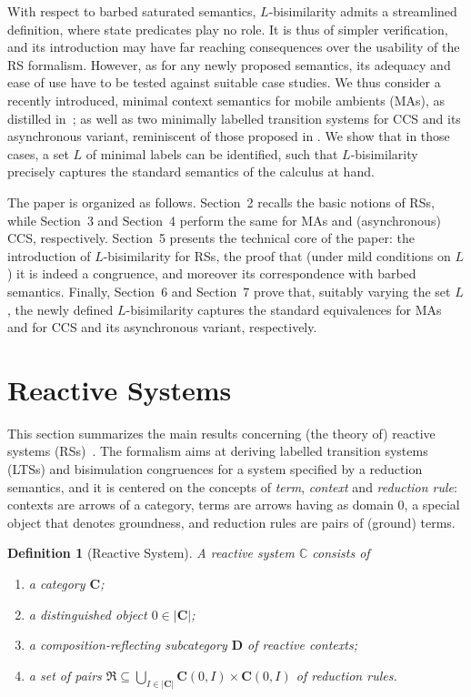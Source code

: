 \documentclass[copyright,creativecommons]{eptcs}
\newcommand{\Rules}[1]{\mathfrak{#1}}
\newcommand{\<}{\langle}
\renewcommand{\>}{\rangle}
\newtheorem{definition}{Definition}{}
\begin{document}
With respect to barbed saturated semantics, $L$-bisimilarity admits a
streamlined definition, where state predicates play no role. It is
thus of simpler verification, and its introduction may have far
reaching consequences over the usability of the RS formalism. However,
as for any newly proposed semantics, its adequacy and ease of use have
to be tested against suitable case studies. We thus consider a recently
introduced, minimal context semantics for mobile ambients (MAs), as distilled
in~\cite{BoGaMo}; as well as two minimally labelled transition systems
for CCS and its asynchronous variant, reminiscent of those proposed in
\cite{bgk:bisimulation-graph-enc}. We show that in those cases, a set
$L$ of minimal labels can be identified, such that $L$-bisimilarity
precisely captures the standard semantics of the calculus at hand.

The paper is organized as follows. Section~2 recalls the basic notions
of RSs, while Section~3 and Section~4 perform the same for MAs and
(asynchronous) CCS, respectively. Section~5 presents the technical
core of the paper: the introduction of $L$-bisimilarity for RSs, the
proof that (under mild conditions on $L$) it is indeed a congruence,
and moreover its correspondence with barbed semantics.  Finally,
Section~6 and Section~7 prove that, suitably varying the set $L$, the
newly defined $L$-bisimilarity captures the standard equivalences for
MAs and for CCS and its asynchronous variant, respectively.



\section{Reactive Systems}\label{sec:Rea}

This section summarizes the main results concerning (the theory of)
reactive systems (RSs)~\cite{DBLP:conf/concur/LeiferM00}.  The
formalism aims at deriving labelled transition systems (LTSs) and
bisimulation congruences for a system specified by a reduction
semantics, and it is centered on the concepts of \emph{term},
\emph{context} and \emph{reduction rule}: contexts are arrows of a
category, terms are arrows having as domain $0$, a special object that
denotes groundness, and reduction rules are pairs of (ground) terms.

\begin{definition}[Reactive System] A \emph{reactive system} $\mathbb{C}$
  consists of
  \begin{enumerate}
    \setlength{\itemsep}{0cm}
  \item a category $\mathbf{C}$;
  \item a distinguished object $0 \in |\mathbf{C}|$;
  \item a composition-reflecting subcategory $\mathbf{D}$ of
    \emph{reactive contexts};
  \item a set of pairs $\Rules{R}\subseteq \bigcup_{I\in |\mathbf{C}|}
    \mathbf{C}(0,I)\times
    \mathbf{C}(0,I)$ of \emph{reduction rules}.
  \end{enumerate}
\end{definition}
\end{document}
